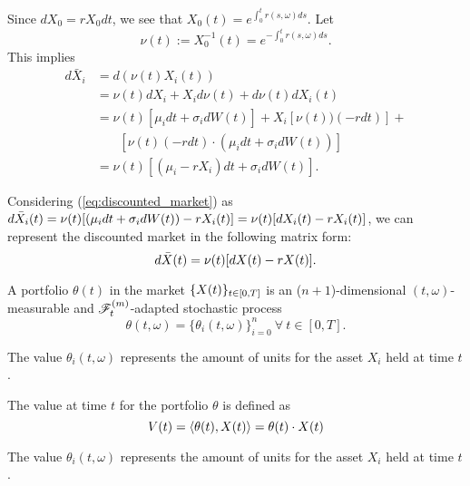 \documentclass[../TGMAFFIRO.tex]{subfiles}
\begin{document}
\begin{remark}
	Since $dX_0 = r X_0 dt$, we see that $X_0(t) = e^{\int_0^tr(s,\omega) ds}$. Let
	\begin{equation}
		\nu(t) := X^{-1}_0(t) = e^{-\int_0^tr(s,\omega) ds}.
	\end{equation}
This implies
\begin{align}
	d\bar X_i &= d\left(\nu(t)X_i(t)\right) \nonumber \\
			&= \nu(t)dX_i + X_id\nu(t) + d\nu(t)dX_i(t)\nonumber\\
			&= \nu(t) [\mu_i dt + \sigma_i dW(t)] + X_i[\nu(t))(-r dt)] + \nonumber\\
			&\phantom{{}=1} [\nu(t)(-r dt)\cdot(\mu_i dt + \sigma_i dW(t))]\nonumber\\
			&=\nu(t)[(\mu_i - r X_i)dt + \sigma_i dW(t)] \label{eq:discounted_market}.
\end{align}

Considering (\ref{eq:discounted_market}) as $d\bar{X}_i(t) = \nu(t)[(\mu_i dt + \sigma_i dW(t)) - r X_i(t)] = \nu(t)[dX_i(t) - r X_i(t)]$, we can represent the discounted market in the following matrix form:
\begin{equation}
  d\bar{X}(t) = \nu(t)[dX(t) - r X(t)]. \label{eq:discounted_market_matrix}
\end{equation}

\end{remark}

\begin{definition}
	A portfolio $\theta(t)$ in the market $\{X(t)\}_{t\in[0,T]}$ is an ($n+1$)-dimensional $(t,\omega)$-measurable and $\mathscr{F}_t^{(m)}$-adapted stochastic process
	\begin{equation}
		\theta(t,\omega) = \{\theta_{i}(t,\omega)\}_{i=0}^{n} \ \forall \ t\in[0, T].
	\end{equation}
\end{definition}

The value $\theta_i(t,\omega)$ represents the amount of units for the asset $X_i$ held at time $t$.

\begin{definition}
	The value at time $t$ for the portfolio $\theta$ is defined as
	\begin{equation}
		V(t) = \langle \theta(t), X(t)\rangle = \theta(t) \cdot X(t)
	\end{equation}
\end{definition}
The value $\theta_i(t,\omega)$ represents the amount of units for the asset $X_i$ held at time $t$.
\end{document}
